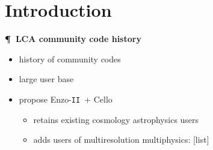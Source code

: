 \documentclass[11pt,letterpaper]{article}
\newcommand{\devel}[1]{\textbf{#1}}
\newcommand{\pargraph}[1]{\devel{\P\ \textbf{#1} \\}}
\newcommand{\cello}{\textsf{Cello}}
\newcommand{\enzoii}{\textsf{Enzo}-\texttt{II}}
\begin{document}
%
%
%
%
%


\section{Introduction} \label{s:intro}


\pargraph{LCA community code history}
\begin{itemize}
\item history of community codes
\item large user base
\item propose \enzoii\ + \cello
\begin{itemize}
\item retains existing cosmology astrophysics users
\item adds users of multiresolution multiphysics: [list]
\end{itemize}
\end{itemize}
\end{document}
